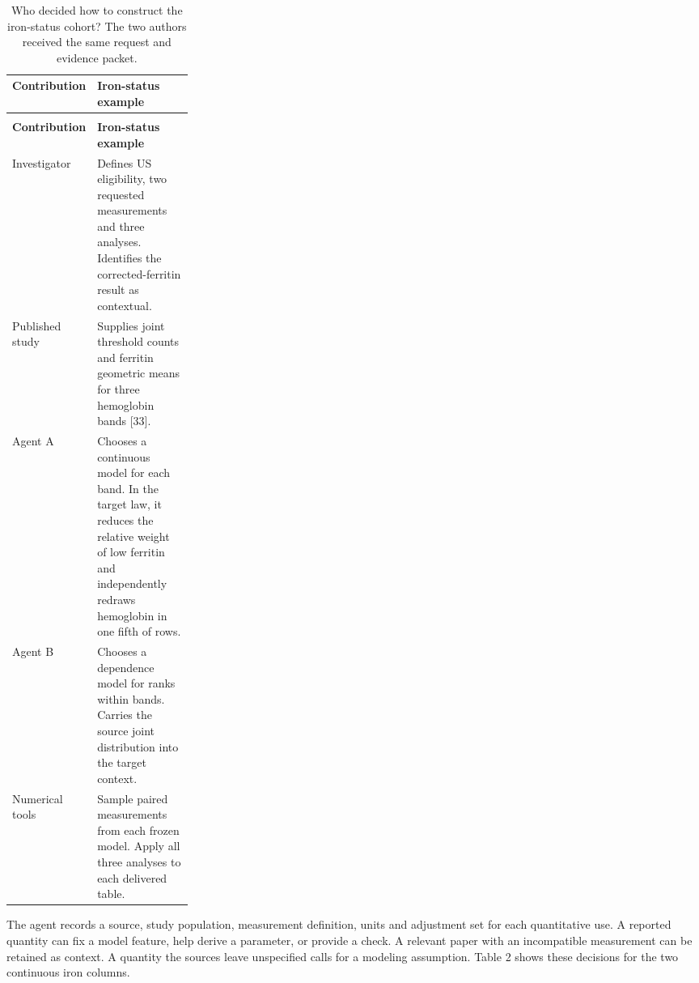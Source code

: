 \documentclass[11pt,letterpaper]{article}
\begin{document}
\begin{xltabular}{\linewidth}{@{}>{\raggedright\arraybackslash}p{0.26\linewidth}>{\raggedright\arraybackslash}X@{}}

\caption{Who decided how to construct the iron-status cohort? The two authors received the same request and evidence packet.}\label{tab:1} \\

\toprule

\textbf{Contribution} & \textbf{Iron-status example} \\

\midrule

\endfirsthead

\\

\toprule

\textbf{Contribution} & \textbf{Iron-status example} \\

\midrule

\endhead

\bottomrule

\endfoot

Investigator & Defines US eligibility, two requested measurements and three analyses. Identifies the corrected-ferritin result as contextual. \\

Published study & Supplies joint threshold counts and ferritin geometric means for three hemoglobin bands [33]. \\

Agent A & Chooses a continuous model for each band. In the target law, it reduces the relative weight of low ferritin and independently redraws hemoglobin in one fifth of rows. \\

Agent B & Chooses a dependence model for ranks within bands. Carries the source joint distribution into the target context. \\

Numerical tools & Sample paired measurements from each frozen model. Apply all three analyses to each delivered table. \\

\end{xltabular}

\endgroup

The agent records a source, study population, measurement definition, units and adjustment set for each quantitative use. A reported quantity can fix a model feature, help derive a parameter, or provide a check. A relevant paper with an incompatible measurement can be retained as context. A quantity the sources leave unspecified calls for a modeling assumption. Table 2 shows these decisions for the two continuous iron columns.
\end{document}
